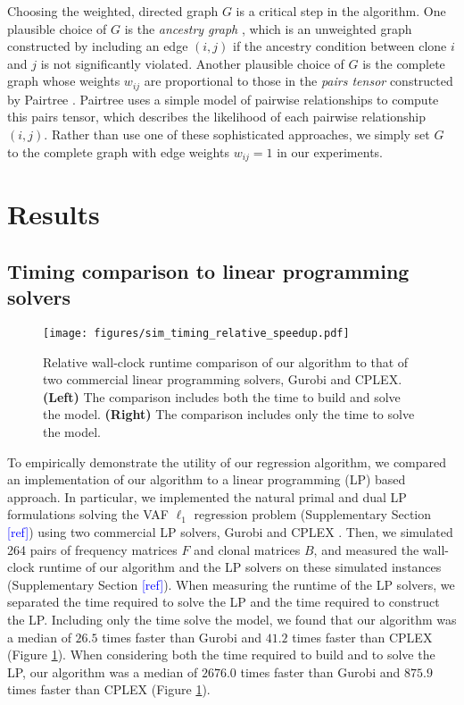 \documentclass[10pt]{article}
\newcommand{\henri}[1]{\textcolor{blue}{[#1]}}
\begin{document}
Choosing the weighted, directed graph $G$ is a critical step in the algorithm. 
One plausible choice of $G$ is the \emph{ancestry graph} \cite{el-kebir_reconstruction_2015, myers_calder_2019},
which is an unweighted graph constructed by including an edge $(i, j)$ if the ancestry condition \cite{el-kebir_reconstruction_2015}
between clone $i$ and $j$ is not significantly violated. Another plausible choice of $G$ is 
the complete graph whose weights $w_{ij}$ are proportional to those in the \emph{pairs tensor} constructed by 
Pairtree \cite{wintersinger_reconstructing_2022}. Pairtree \cite{wintersinger_reconstructing_2022} uses a simple model of 
pairwise relationships to compute this pairs tensor, which describes the likelihood of each pairwise relationship $(i, j)$.
Rather than use one of these sophisticated approaches, we simply set $G$ to the complete graph with edge weights $w_{ij} = 1$ 
in our experiments.


\section{Results}
\label{sec:results}
\subsection{Timing comparison to linear programming solvers}
\label{sec:results_mathprog}
\begin{figure}[t]
    \centering
    \texttt{[image: figures/sim\_timing\_relative\_speedup.pdf]}
    \caption{
        \label{fig:sim_timing_relative_speedup}
        Relative wall-clock runtime comparison of our algorithm to that of two commercial linear programming solvers, 
        Gurobi and CPLEX. \textbf{(Left)} The comparison includes both the time to build and solve the model. 
        \textbf{(Right)} The comparison includes only the time to solve the model.
    }
\end{figure}

To empirically demonstrate the utility of our regression algorithm, we compared an
implementation of our algorithm to a linear programming (LP) based approach.
In particular, we implemented the natural primal and dual LP formulations solving the VAF 
$\ell_1$ regression problem (Supplementary Section \henri{ref}) using two 
commercial LP solvers, Gurobi \cite{gurobi} and CPLEX \cite{ibm_cplex}. Then, we simulated
264 pairs of frequency matrices $F$ and clonal matrices $B$, and measured
the wall-clock runtime of our algorithm and the LP solvers on these simulated instances (Supplementary Section \henri{ref}). 
When measuring the runtime of the LP solvers, we separated the 
time required to solve the LP and the time required to construct the LP. Including only the
time solve the model, we found that our algorithm was a median of $26.5$ times faster than Gurobi and 
$41.2$ times faster than CPLEX (Figure \ref{fig:sim_timing_relative_speedup}). 
When considering both the time required to build and to solve the LP, our algorithm was a median of $2676.0$ times faster than Gurobi 
and $875.9$ times faster than CPLEX (Figure \ref{fig:sim_timing_relative_speedup}). 
\end{document}
